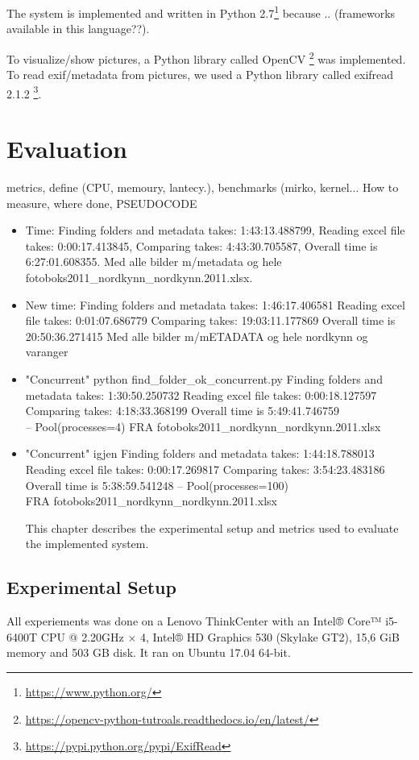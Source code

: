 \documentclass[USenglish]{uit-thesis}
\begin{document}
The system is implemented and written in Python 2.7\footnote{\url{https://www.python.org/}} because .. (frameworks available in this language??).

To visualize/show pictures, a Python library called OpenCV \footnote{\url{https://opencv-python-tutroals.readthedocs.io/en/latest/}} was implemented.
To read exif/metadata from pictures, we used a Python library called exifread 2.1.2 \footnote{\url{https://pypi.python.org/pypi/ExifRead}}.

\chapter{Evaluation} 
metrics, define (CPU, memoury, lantecy.), benchmarks (mirko, kernel...
How to measure, where done, PSEUDOCODE

\begin{itemize}
\item Time: Finding folders and metadata takes:  1:43:13.488799,
Reading excel file takes:  0:00:17.413845,
Comparing takes:  4:43:30.705587,
Overall time is  6:27:01.608355.
Med alle bilder m/metadata og hele fotoboks2011\_nordkynn\_nordkynn.2011.xlsx.

\item New time: Finding folders and metadata takes:  1:46:17.406581
Reading excel file takes:  0:01:07.686779
Comparing takes:  19:03:11.177869
Overall time is  20:50:36.271415
Med alle bilder m/mETADATA og hele nordkynn og varanger

\item "Concurrent" python find\_folder\_ok\_concurrent.py 
Finding folders and metadata takes:  1:30:50.250732
Reading excel file takes:  0:00:18.127597
Comparing takes:  4:18:33.368199
Overall time is  5:49:41.746759
\\ -- Pool(processes=4)
FRA fotoboks2011\_nordkynn\_nordkynn.2011.xlsx

\item "Concurrent" igjen
Finding folders and metadata takes:  1:44:18.788013
Reading excel file takes:  0:00:17.269817
Comparing takes:  3:54:23.483186
Overall time is  5:38:59.541248
-- Pool(processes=100)
\\ FRA fotoboks2011\_nordkynn\_nordkynn.2011.xlsx

This chapter describes the experimental setup and metrics used to evaluate the implemented system. 

\end{itemize}
\section{Experimental Setup}
All experiements was done on a Lenovo ThinkCenter with an Intel® Core™ i5-6400T CPU @ 2.20GHz × 4, Intel® HD Graphics 530 (Skylake GT2), 15,6 GiB memory and 503 GB disk. It ran on Ubuntu 17.04 64-bit.
\end{document}
